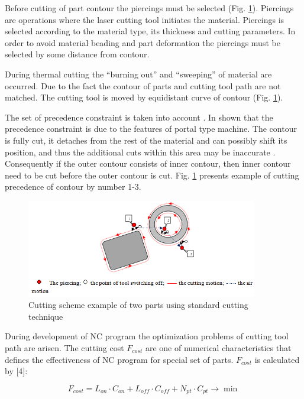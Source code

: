 \documentclass[runningheads]{llncs}
\begin{document}
Before cutting of part contour the piercings must be selected (Fig. \ref{elements}).
Piercings are operations where the laser cutting tool initiates the material.
Piercings is selected according to the material type, its thickness and cutting parameters.
In order to avoid material beading and part deformation the piercings must be selected by some distance from contour.

During thermal cutting the ``burning out'' and ``sweeping'' of material are occurred.
Due to the fact the contour of parts and cutting tool path are not matched.
The cutting tool is moved by equidistant curve of contour (Fig. \ref{elements}).

The set of precedence constraint is taken into account \cite{ru01}.
In \cite{ru02} shown that the precedence constraint is due to the features of portal type machine.
The contour is fully cut, it detaches from the rest of the material and can possibly shift its position,
and thus the additional cuts within this area may be inaccurate \cite{Dewil2015}.
Consequently if the outer contour consists of inner contour,
then inner contour need to be cut before the outer contour is cut.
Fig. \ref{elements} presents example of cutting precedence of contour by number 1-3.

\begin{figure}
  \begin{center}
  \includegraphics[width=0.9\textwidth]{elements.png}
  \caption{Cutting scheme example of two parts using standard cutting technique}
  \label{elements}
  \end{center}
\end{figure}

During development of NC program the optimization problems of cutting tool path are arisen.
The cutting cost $F_{cost}$ are one of numerical characteristics
that defines the effectiveness of NC program for special set of parts.
$F_{cost}$ is calculated by [4]:

\begin{equation}
F_{cost} =
L_{on} \cdot C_{on} +
L_{off} \cdot C_{off} +
N_{pt} \cdot C_{pt}
\to \min
\label{cost}
\end{equation}
\end{document}
